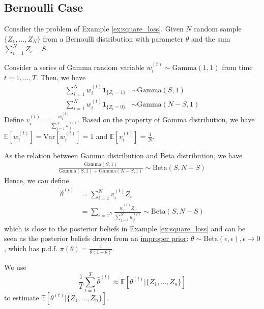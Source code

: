 \documentclass[11pt]{elegantbook}
\begin{document}
\subsection{Bernoulli Case}
Consdier the problem of Example \ref{ex:square_loss}. Given $N$ random sample $\{Z_1,...,Z_N\}$ from a Bernoulli distribution with parameter $\theta$ and the sum $\sum_{i=1}^N Z_i=S$.

Consider a series of Gamma random variable $w_i^{(t)}\sim \text{Gamma}(1,1)$ from time $t=1,...,T$. Then, we have
\begin{equation}
    \begin{aligned}
        \sum_{i=1}^N w_i^{(t)} \mathbf{1}_{\{Z_i=1\}}&\sim \text{Gamma}(S,1)\\
        \sum_{i=1}^N w_i^{(t)} \mathbf{1}_{\{Z_i=0\}}&\sim \text{Gamma}(N-S,1)
    \end{aligned}
    \nonumber
\end{equation}
Define $v_i^{(t)}=\frac{w_i^{(t)}}{\sum_{j=1}^N w_j^{(t)}}$. Based on the property of Gamma distribution, we have $\mathbb{E}[w_i^{(t)}]=\text{Var}[w_i^{(t)}]=1$ and $\mathbb{E}[v_i^{(t)}]=\frac{1}{N}$.

As the relation between Gamma distribution and Beta distribution, we have
\begin{equation}
    \begin{aligned}
        \frac{\text{Gamma}(S,1)}{\text{Gamma}(S,1)+\text{Gamma}(N-S,1)}\sim \text{Beta}(S,N-S)
    \end{aligned}
    \nonumber
\end{equation}
Hence, we can define
\begin{equation}
    \begin{aligned}
        \hat{\theta}^{(t)}&=\sum_{i=1}^N v_i^{(t)}Z_i\\
        &=\sum_{i=1^N}\frac{w_i^{(t)}Z_i}{\sum_{j=1}^N w_j^{(t)}}\sim \text{Beta}(S,N-S)
    \end{aligned}
    \nonumber
\end{equation}
which is close to the posterior beliefs in Example \ref{ex:square_loss} and can be seen as the posterior beliefs drawn from an \underline{improper prior}: $\theta\sim \text{Beta}(\epsilon,\epsilon), \epsilon \rightarrow 0$, which has p.d.f. $\pi(\theta)=\frac{1}{\theta(1-\theta)}$.

We use $$\frac{1}{T}\sum_{t=1}^T\hat{\theta}^{(t)}\approx \mathbb{E}[\theta^{(t)}|\{Z_1,...,Z_n\}]$$ to estimate $\mathbb{E}[\theta^{(t)}|\{Z_1,...,Z_n\}]$.
\end{document}
